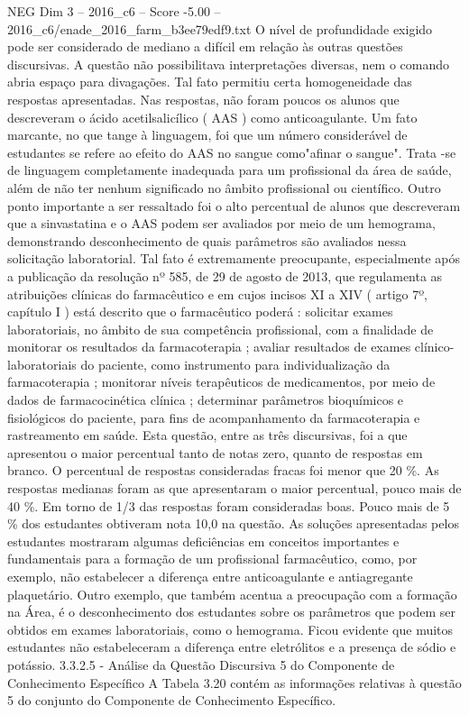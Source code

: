 \begin{textsample}{NEG Dim 3 – 2016\_c6 – Score -5.00 – 2016\_c6/enade\_2016\_farm\_b3ee79edf9.txt}
O nível de profundidade exigido pode ser considerado de mediano a difícil em relação às outras questões discursivas.
A questão não possibilitava interpretações diversas, nem o comando abria espaço para divagações.
Tal fato permitiu certa homogeneidade das respostas apresentadas.
Nas respostas, não foram poucos os alunos que descreveram o ácido acetilsalicílico ( AAS ) como anticoagulante.
Um fato marcante, no que tange à linguagem, foi que um número considerável de estudantes se refere ao efeito do AAS no sangue como"afinar o sangue".
Trata -se de linguagem completamente inadequada para um profissional da área de saúde, além de não ter nenhum significado no âmbito profissional ou científico.
Outro ponto importante a ser ressaltado foi o alto percentual de alunos que descreveram que a sinvastatina e o AAS podem ser avaliados por meio de um hemograma, demonstrando desconhecimento de quais parâmetros são avaliados nessa solicitação laboratorial.
Tal fato é extremamente preocupante, especialmente após a publicação da resolução nº 585, de 29 de agosto de 2013, que regulamenta as atribuições clínicas do farmacêutico e em cujos incisos XI a XIV ( artigo 7º, capítulo I ) está descrito que o farmacêutico poderá : solicitar exames laboratoriais, no âmbito de sua competência profissional, com a finalidade de monitorar os resultados da farmacoterapia ; avaliar resultados de exames clínico-laboratoriais do paciente, como instrumento para individualização da farmacoterapia ; monitorar níveis terapêuticos de medicamentos, por meio de dados de farmacocinética clínica ; determinar parâmetros bioquímicos e fisiológicos do paciente, para fins de acompanhamento da farmacoterapia e rastreamento em saúde.
Esta questão, entre as três discursivas, foi a que apresentou o maior percentual tanto de notas zero, quanto de respostas em branco.
O percentual de respostas consideradas fracas foi menor que 20 \%.
As respostas medianas foram as que apresentaram o maior percentual, pouco mais de 40 \%.
Em torno de 1/3 das respostas foram consideradas boas.
Pouco mais de 5 \% dos estudantes obtiveram nota 10,0 na questão.
As soluções apresentadas pelos estudantes mostraram algumas deficiências em conceitos importantes e fundamentais para a formação de um profissional farmacêutico, como, por exemplo, não estabelecer a diferença entre anticoagulante e antiagregante plaquetário.
Outro exemplo, que também acentua a preocupação com a formação na Área, é o desconhecimento dos estudantes sobre os parâmetros que podem ser obtidos em exames laboratoriais, como o hemograma.
Ficou evidente que muitos estudantes não estabeleceram a diferença entre eletrólitos e a presença de sódio e potássio. 3.3.2.5 - Análise da Questão Discursiva 5 do Componente de Conhecimento Específico A Tabela 3.20 contém as informações relativas à questão 5 do conjunto do Componente de Conhecimento Específico.

\end{textsample}
